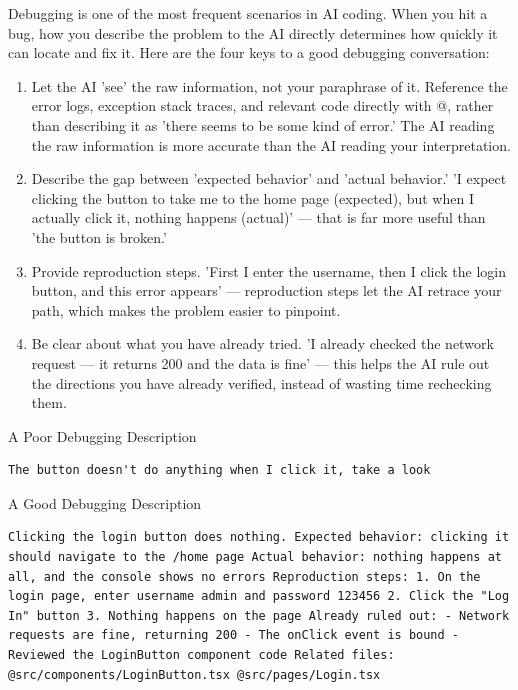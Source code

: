 
Debugging is one of the most frequent scenarios in AI coding. When you hit a bug, how you describe the problem to the AI directly determines how quickly it can locate and fix it. Here are the four keys to a good debugging conversation:

\begin{enumerate}
  \item Let the AI 'see' the raw information, not your paraphrase of it. Reference the error logs, exception stack traces, and relevant code directly with @, rather than describing it as 'there seems to be some kind of error.' The AI reading the raw information is more accurate than the AI reading your interpretation.
  \item Describe the gap between 'expected behavior' and 'actual behavior.' 'I expect clicking the button to take me to the home page (expected), but when I actually click it, nothing happens (actual)' — that is far more useful than 'the button is broken.'
  \item Provide reproduction steps. 'First I enter the username, then I click the login button, and this error appears' — reproduction steps let the AI retrace your path, which makes the problem easier to pinpoint.
  \item Be clear about what you have already tried. 'I already checked the network request — it returns 200 and the data is fine' — this helps the AI rule out the directions you have already verified, instead of wasting time rechecking them.
\end{enumerate}

A Poor Debugging Description

\begin{lstlisting}
The button doesn't do anything when I click it, take a look
\end{lstlisting}

A Good Debugging Description

\begin{lstlisting}
Clicking the login button does nothing. Expected behavior: clicking it should navigate to the /home page Actual behavior: nothing happens at all, and the console shows no errors Reproduction steps: 1. On the login page, enter username admin and password 123456 2. Click the "Log In" button 3. Nothing happens on the page Already ruled out: - Network requests are fine, returning 200 - The onClick event is bound - Reviewed the LoginButton component code Related files: @src/components/LoginButton.tsx @src/pages/Login.tsx
\end{lstlisting}

